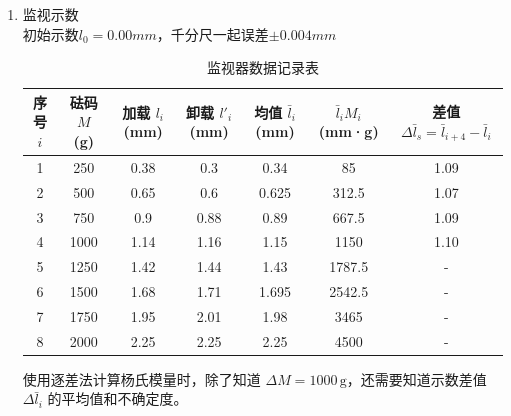 \documentclass[11pt]{article}
\begin{document}
\begin{enumerate}
    \[
    s = \sqrt{\frac{0.000026}{5}} = \sqrt{0.0000052} \approx 0.0022804 \, \text{mm}
    \]
    
    A类不确定度：
    \[
    u_A = \frac{s}{\sqrt{n}} = \frac{0.0022804}{\sqrt{6}} \approx 0.0009307 \, \text{mm}
    \]
    
    \textbf{B类不确定度计算}
    
    \[
    u_B = \frac{e}{\sqrt{3}} = \frac{0.004}{\sqrt{3}} \approx 0.002309 \, \text{mm}
    \]
    
    \textbf{合成不确定度}
    
    \[
    u_c = \sqrt{u_A^2 + u_B^2} = \sqrt{(0.0009307)^2 + (0.002309)^2} \approx 0.002489 \, \text{mm}
    \]
    
    不确定度修约（保留一位有效数字，只进不退）：$u_c = 0.003 \, \text{mm}$
    
    \textbf{最终结果：}
    \[
    d = (0.183 \pm 0.003) \, \text{mm}
    \]

    \item 监视示数 \\
    初始示数$l_0=0.00mm$，千分尺一起误差$\pm 0.004mm$
    \begin{table}[htbp]
    \centering
    \begin{tabular}{c c c c c c c}
    \toprule
    序号 \( i \) & 砝码 \( M \) (g) & 加载 \( l_i \) (mm) & 卸载 \( l'_i \) (mm) & 均值 \( \bar{l}_i \) (mm) & \( \bar{l}_iM_i \) (mm·g) & 差值 \( \Delta\bar{l}_s = \bar{l}_{i+4} - \bar{l}_i \) \\
    \midrule
    1 & 250 & 0.38 & 0.3 & 0.34 & 85 & 1.09 \\
    2 & 500 & 0.65 & 0.6 & 0.625 & 312.5 & 1.07 \\
    3 & 750 & 0.9 & 0.88 & 0.89 & 667.5 & 1.09 \\
    4 & 1000 & 1.14 & 1.16 & 1.15 & 1150 & 1.10 \\
    5 & 1250 & 1.42 & 1.44 & 1.43 & 1787.5 & - \\
    6 & 1500 & 1.68 & 1.71 & 1.695 & 2542.5 & - \\
    7 & 1750 & 1.95 & 2.01 & 1.98 & 3465 & - \\
    8 & 2000 & 2.25 & 2.25 & 2.25 & 4500 & - \\
    \bottomrule
    \end{tabular}
    \caption{监视器数据记录表}
    \end{table}
    使用逐差法计算杨氏模量时，除了知道 \( \Delta M = 1000 \, \text{g} \)，还需要知道示数差值 \( \Delta \bar{l}_i \) 的平均值和不确定度。


\end{enumerate}
\end{document}
